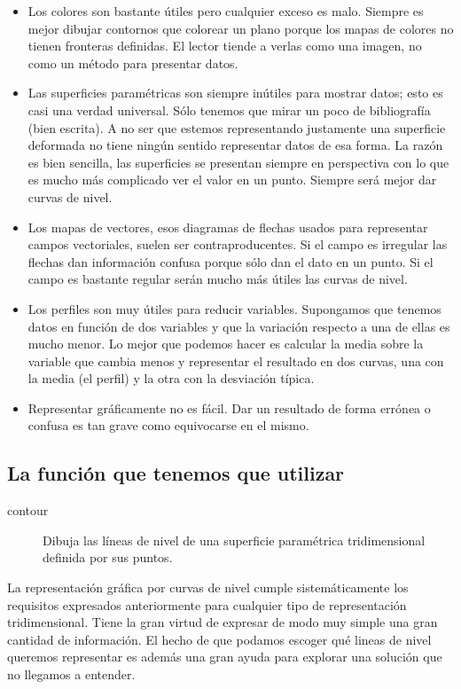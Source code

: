 \begin{itemize}
\item Los colores son bastante útiles pero cualquier exceso es malo. Siempre
es mejor dibujar contornos que colorear un plano porque los mapas
de colores no tienen fronteras definidas. El lector tiende a verlas
como una imagen, no como un método para presentar datos.
\item Las superficies paramétricas son siempre inútiles para mostrar datos;
esto es casi una verdad universal. Sólo tenemos que mirar un poco
de bibliografía (bien escrita). A no ser que estemos representando
justamente una superficie deformada no tiene ningún sentido representar
datos de esa forma. La razón es bien sencilla, las superficies se
presentan siempre en perspectiva con lo que es mucho más complicado
ver el valor en un punto. Siempre será mejor dar curvas de nivel.
\item Los mapas de vectores, esos diagramas de flechas usados para representar
campos vectoriales, suelen ser contraproducentes. Si el campo es irregular
las flechas dan información confusa porque sólo dan el dato en un
punto. Si el campo es bastante regular serán mucho más útiles las
curvas de nivel.
\item Los perfiles son muy útiles para reducir variables. Supongamos que
tenemos datos en función de dos variables y que la variación respecto
a una de ellas es mucho menor. Lo mejor que podemos hacer es calcular
la media sobre la variable que cambia menos y representar el resultado
en dos curvas, una con la media (el perfil) y la otra con la desviación
típica.
\item Representar gráficamente no es fácil. Dar un resultado de forma errónea
o confusa es tan grave como equivocarse en el mismo.
\end{itemize}

\subsection{La función que tenemos que utilizar}

\begin{description}
\item [contour\texttt{}]Dibuja las líneas de nivel de una
superficie paramétrica tridimensional definida por sus puntos.
\end{description}
La representación gráfica por curvas de nivel cumple sistemáticamente
los requisitos expresados anteriormente para cualquier tipo de representación
tridimensional. Tiene la gran virtud de expresar de modo muy simple
una gran cantidad de información. El hecho de que podamos escoger
qué lineas de nivel queremos representar es además una gran ayuda
para explorar una solución que no llegamos a entender.

